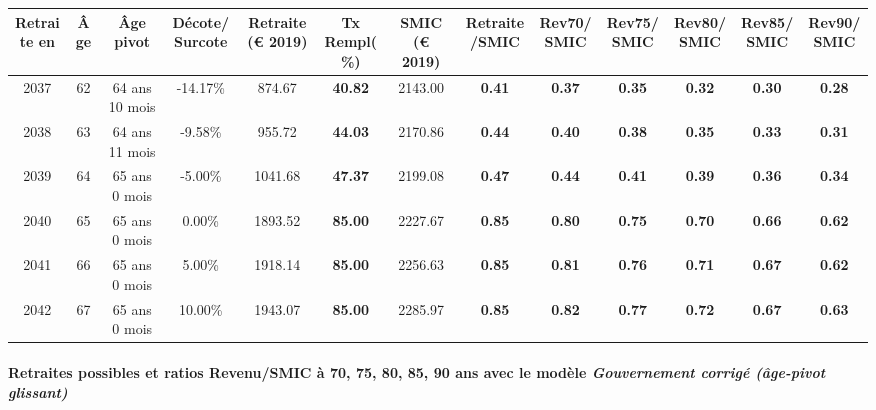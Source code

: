 { \scriptsize \begin{center} 
\begin{tabular}[htb]{|c|c||c|c||c|c||c||c|c|c|c|c|c|} 
\hline 
 Retraite en &  Âge &  Âge pivot &  Décote/Surcote &  Retraite (\euro{} 2019) &  Tx Rempl(\%) &  SMIC (\euro{} 2019) &  Retraite/SMIC &  Rev70/SMIC &  Rev75/SMIC &  Rev80/SMIC &  Rev85/SMIC &  Rev90/SMIC \\ 
\hline \hline 
 2037 &  62 &  64 ans 10 mois &  -14.17\% &  874.67 &  {\bf 40.82} &  2143.00 &  {\bf {\color{red} 0.41}} &  {\bf {\color{red} 0.37}} &  {\bf {\color{red} 0.35}} &  {\bf {\color{red} 0.32}} &  {\bf {\color{red} 0.30}} &  {\bf {\color{red} 0.28}} \\ 
\hline 
 2038 &  63 &  64 ans 11 mois &  -9.58\% &  955.72 &  {\bf 44.03} &  2170.86 &  {\bf {\color{red} 0.44}} &  {\bf {\color{red} 0.40}} &  {\bf {\color{red} 0.38}} &  {\bf {\color{red} 0.35}} &  {\bf {\color{red} 0.33}} &  {\bf {\color{red} 0.31}} \\ 
\hline 
 2039 &  64 &  65 ans 0 mois &  -5.00\% &  1041.68 &  {\bf 47.37} &  2199.08 &  {\bf {\color{red} 0.47}} &  {\bf {\color{red} 0.44}} &  {\bf {\color{red} 0.41}} &  {\bf {\color{red} 0.39}} &  {\bf {\color{red} 0.36}} &  {\bf {\color{red} 0.34}} \\ 
\hline 
 2040 &  65 &  65 ans 0 mois &  0.00\% &  1893.52 &  {\bf 85.00} &  2227.67 &  {\bf {\color{red} 0.85}} &  {\bf {\color{red} 0.80}} &  {\bf {\color{red} 0.75}} &  {\bf {\color{red} 0.70}} &  {\bf {\color{red} 0.66}} &  {\bf {\color{red} 0.62}} \\ 
\hline 
 2041 &  66 &  65 ans 0 mois &  5.00\% &  1918.14 &  {\bf 85.00} &  2256.63 &  {\bf {\color{red} 0.85}} &  {\bf {\color{red} 0.81}} &  {\bf {\color{red} 0.76}} &  {\bf {\color{red} 0.71}} &  {\bf {\color{red} 0.67}} &  {\bf {\color{red} 0.62}} \\ 
\hline 
 2042 &  67 &  65 ans 0 mois &  10.00\% &  1943.07 &  {\bf 85.00} &  2285.97 &  {\bf {\color{red} 0.85}} &  {\bf {\color{red} 0.82}} &  {\bf {\color{red} 0.77}} &  {\bf {\color{red} 0.72}} &  {\bf {\color{red} 0.67}} &  {\bf {\color{red} 0.63}} \\ 
\hline 
\hline 
\end{tabular} 
\end{center} } 
\paragraph{Retraites possibles et ratios Revenu/SMIC à 70, 75, 80, 85, 90 ans avec le modèle \emph{Gouvernement corrigé (âge-pivot glissant)}}  
 
